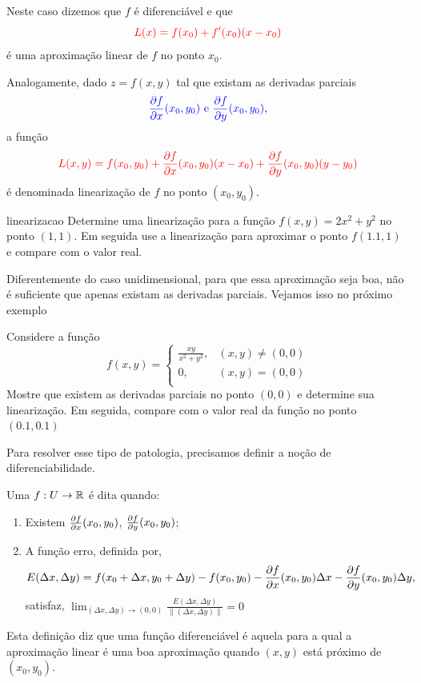 Neste caso dizemos que $f$ é {\color{blue} diferenciável} e  que
\[{\color{red}L(x)=f(x_0)+f'(x_0)(x-x_0)}\]
é uma {\color{red} aproximação linear} de $f$ no ponto $x_0$.


\newpage

Analogamente, dado \(z=f(x,y)\) tal que existam as derivadas parciais
\[
{\color{blue}\frac{\partial f}{\partial x}(x_0,y_0) \text{ e }
\frac{\partial f}{\partial y}(x_0,y_0)},
\]
a função
\[{\color{red}L(x,y)=f(x_0,y_0)+\frac{\partial f}{\partial x}(x_0,y_0)(x-x_0)+\frac{\partial f}{\partial y}(x_0,y_0)(y-y_0)}\]
é denominada {\color{red}linearização} de $f$ no ponto $(x_0,y_0)$.

\begin{exeb}{}{linearizacao}
 Determine uma linearização para a função \(f(x,y)=2x^2+y^2\) no ponto \((1,1)\). Em seguida use a linearização para aproximar o ponto \(f(1.1,1)\) e compare com o valor real.
\end{exeb}
\vfill

Diferentemente do caso unidimensional, para que essa aproximação seja boa, {\color{red}não é suficiente} que apenas existam as derivadas parciais. Vejamos isso no próximo exemplo

\begin{exeb}{}{}
Considere a função
\[f(x,y)=\left\{\begin{array}{ll}
	\displaystyle\frac{xy}{x^2+y^2}, &(x,y)\neq (0,0)\\
	0, & (x,y)=(0,0)\\
\end{array}\right.
\]
Mostre que existem as derivadas parciais no ponto \((0,0)\) e determine sua linearização. Em seguida, compare com o valor real da função no ponto \((0.1,0.1)\)
\end{exeb}
\newpage

Para resolver esse tipo de patologia, precisamos definir a noção de {\color{blue}diferenciabilidade}.

\begin{definb}{}{}
	Uma $f:U\to \mathbb{R}$ é dita  quando:

\begin{enumerate}
	\item Existem $\frac{\partial f}{\partial x}(x_0,y_0)$, $\frac{\partial f}{\partial y}(x_0,y_0)$;
	\item A função {\color{blue}erro}, definida por,
\begin{equation*}
	E(\Delta x,\Delta y)=
	f(x_0+\Delta x,y_0+\Delta y)-f(x_0,y_0)-\frac{\partial f}{\partial x}(x_0,y_0)\Delta x-\frac{\partial f}{\partial y}(x_0,y_0) \Delta y,
\end{equation*}
satisfaz, $\displaystyle\lim_{(\Delta x,\Delta y)\to(0,0)}\frac{E(\Delta x,\Delta y)}{\|(\Delta x,\Delta y)\|}=0$
\end{enumerate}
\end{definb}
\begin{caixavermelha}{}
	Esta definição diz que uma função diferenciável é aquela para a qual a aproximação linear é uma boa aproximação quando $(x,y)$ está próximo de $(x_0,y_0)$.
\end{caixavermelha}

